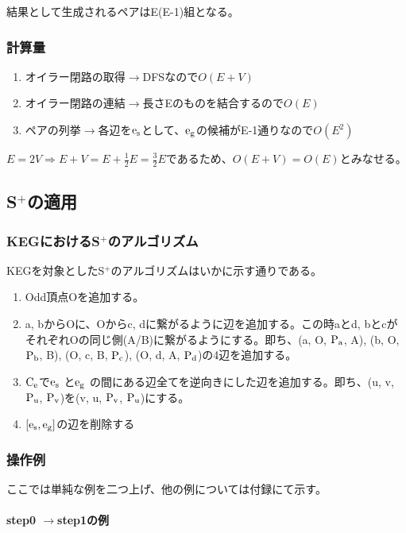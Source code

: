 \documentclass[11pt,a4j]{jarticle}
\newcommand{\splus}{S${}^\text{+}$}
\newcommand{\fl}[1]{$\rm{#1}$}
\newcommand{\ra }{$\rightarrow$}
\begin{document}
結果として生成されるペアはE(E-1)組となる。

\subsubsection{計算量}
\begin{enumerate}
    \item オイラー閉路の取得\ra DFSなので$O(E+V)$
    \item オイラー閉路の連結\ra 長さEのものを結合するので$O(E)$
    \item ペアの列挙\ra 各辺を\fl{e_s}として、\fl{e_g}の候補がE-1通りなので$O(E^2)$
\end{enumerate}
$E=2V \Rightarrow E+V=E+\frac{1}{2}E=\frac{3}{2}E$であるため、$O(E+V)=O(E)$とみなせる。

\subsection{\splus の適用}

\subsubsection{KEGにおける\splus のアルゴリズム}
KEGを対象とした\splus のアルゴリズムはいかに示す通りである。
\begin{enumerate}
    \item Odd頂点Oを追加する。
    \item a, bからOに、Oからc, dに繋がるように辺を追加する。この時aとd, bとcがそれぞれOの同じ側(A/B)に繋がるようにする。即ち、(a, O, \fl{P_a}, A), (b, O, \fl{P_b}, B), (O, c, B, \fl{P_c}), (O, d, A, \fl{P_d})の4辺を追加する。
    \item \fl{C_e}で\fl{e_s} と\fl{e_g} の間にある辺全てを逆向きにした辺を追加する。即ち、(u, v, \fl{P_u}, \fl{P_v})を(v, u, \fl{P_v}, \fl{P_u})にする。
    \item $[\rm{e_s}, \rm{e_g}]$の辺を削除する
\end{enumerate}

\subsubsection{操作例}
ここでは単純な例を二つ上げ、他の例については付録にて示す。

\paragraph{step0 \ra  step1の例}
\end{document}
